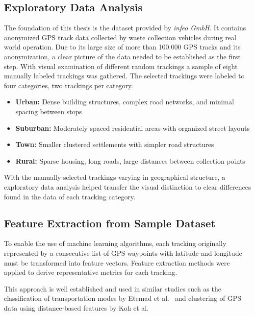 \documentclass[a4paper,12pt,twoside]{scrreprt}
\begin{document}
\subsection{Exploratory Data Analysis}

The foundation of this thesis is the dataset provided by \textit{infeo GmbH}.
It contains anonymized GPS track data collected by waste collection vehicles
during real world operation. Due to its large size of more than 100.000 GPS
tracks and its anonymization, a clear picture of the data needed to be
established as the first step.
With visual examination of different random trackings a sample of eight
manually labeled trackings was gathered.
The selected trackings were labeled to four categories, two trackings per
category.

\begin{itemize}
  \item \textbf{Urban:} Dense building structures, complex road networks, and
        minimal
        spacing between stops
  \item \textbf{Suburban:} Moderately spaced residential areas with organized
        street
        layouts
  \item \textbf{Town:} Smaller clustered settlements with simpler road
        structures
  \item \textbf{Rural:} Sparse housing, long roads, large distances between
        collection
        points
\end{itemize}

With the manually selected trackings varying in geographical structure, a
exploratory data
analysis helped transfer the visual distinction to clear differences found in
the data of each tracking category.

\subsection{Feature Extraction from Sample Dataset}
To enable the use of machine learning algorithms, each tracking originally
represented by a consecutive list of GPS waypoints with latitude and longitude
must be transformed into feature vectors. Feature extraction methods were
applied to derive representative metrics for each tracking.

This approach is well established and used in similar studies such as the
classification
of transportation modes by Etemad et al.~\cite{etemad_predicting_2018} and
clustering of GPS data using distance-based features by Koh et
al.~\cite{koh_clustering_2022}
\end{document}
